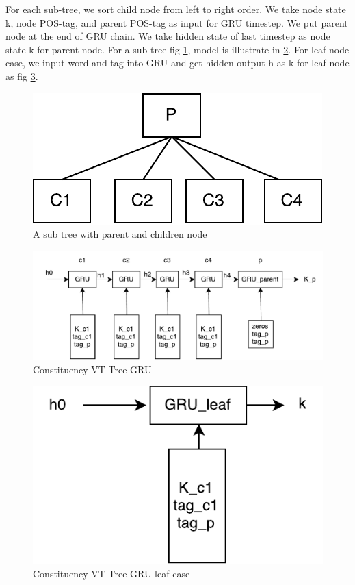 For each sub-tree, we sort child node from left to right order. We take node state k, node POS-tag, and parent POS-tag as input for GRU timestep. We put parent node at the end of GRU chain. We take hidden state of last timestep as node state k for parent node. For a sub tree fig \ref{fig:treecp}, model is illustrate in \ref{fig:cvtgru}. For leaf node case, we input word and tag into GRU and get hidden output h as k for leaf node as fig \ref{fig:gruleaf}.
\begin{figure}[H]
	\centering
	\includegraphics[width=0.5\linewidth]{../figure/treecp}
	\caption[A sub tree with parent and children node]{A sub tree with parent and children node}
	\label{fig:treecp}
\end{figure}

\begin{figure}[H]
	\centering
	\includegraphics[width=0.7\linewidth]{../figure/cvtgru}
	\caption[Constituency VT Tree-GRU]{Constituency VT Tree-GRU}
	\label{fig:cvtgru}
\end{figure}

\begin{figure}[H]
	\centering
	\includegraphics[width=0.4\linewidth]{../figure/gruleaf}
	\caption[Constituency VT Tree-GRU leaf case]{Constituency VT Tree-GRU leaf case}
	\label{fig:gruleaf}
\end{figure}


